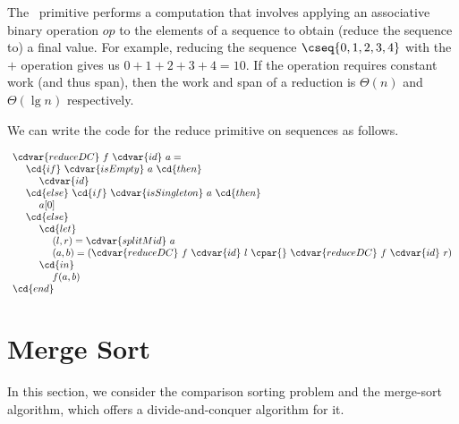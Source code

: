 \begin{cluster}
\label{grp:alg:design::dc::reduce}

\begin{algorithm}
\label{alg:design::dc::reduce}
The~ primitive performs a computation that involves
applying an associative binary operation $op$ to the elements of a
sequence to obtain (reduce the sequence to) a final value.
For example, reducing the sequence $\cseq{0,1,2,3,4}$ with the $+$
operation gives us $0 + 1 + 2 + 3 + 4 = 10$.
If the operation requires constant work (and thus span), then the work
and span of a reduction is $\Theta(n)$ and $\Theta(\lg{n})$ respectively.

We can write the code for the reduce primitive on sequences as
follows.

\[
\begin{array}{l}
\cdvar{reduceDC}~f~\cdvar{id}~a =
\\
~~~~\cd{if}~\cdvar{isEmpty}~ a~\cd{then}
\\
~~~~~~~~\cdvar{id}
\\
~~~~\cd{else}~\cd{if}~\cdvar{isSingleton}~a~\cd{then}
\\
~~~~~~~~a[0]
\\
~~~~\cd{else}
\\ 
~~~~~~~~\cd{let}
\\ 
~~~~~~~~~~~~(l, r) = \cdvar{splitMid}~a
\\
~~~~~~~~~~~~(a, b) = (\cdvar{reduceDC}~f~\cdvar{id}~l~\cpar{}~\cdvar{reduceDC}~f~\cdvar{id}~r)
\\
~~~~~~~~\cd{in} 
\\
~~~~~~~~~~~~f(a,b)
\\ 
\cd{end}        
\end{array} 
\]

\end{algorithm}
\end{cluster}


\section{Merge Sort}
\label{sec:design::dc::msort}

\begin{cluster}
\label{grp:grm:design::dc::consider}

\begin{gram}
\label{grm:design::dc::consider}
In this section, we consider the comparison sorting problem and the
merge-sort algorithm, which offers a divide-and-conquer algorithm for
it.

\end{gram}
\end{cluster}

